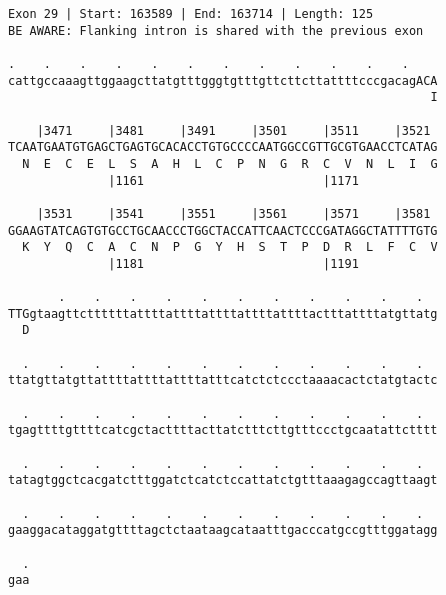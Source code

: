 \documentclass{article}
\begin{document}
\begin{Verbatim}[fontfamily=courier]
Exon 29 | Start: 163589 | End: 163714 | Length: 125
BE AWARE: Flanking intron is shared with the previous exon

.    .    .    .    .    .    .    .    .    .    .    .    
cattgccaaagttggaagcttatgtttgggtgtttgttcttcttattttcccgacagACA
                                                           I

    |3471     |3481     |3491     |3501     |3511     |3521 
TCAATGAATGTGAGCTGAGTGCACACCTGTGCCCCAATGGCCGTTGCGTGAACCTCATAG
  N  E  C  E  L  S  A  H  L  C  P  N  G  R  C  V  N  L  I  G
              |1161                         |1171           

    |3531     |3541     |3551     |3561     |3571     |3581 
GGAAGTATCAGTGTGCCTGCAACCCTGGCTACCATTCAACTCCCGATAGGCTATTTTGTG
  K  Y  Q  C  A  C  N  P  G  Y  H  S  T  P  D  R  L  F  C  V
              |1181                         |1191           

       .    .    .    .    .    .    .    .    .    .    .  
TTGgtaagttcttttttattttattttattttattttattttactttattttatgttatg
  D                                                         

  .    .    .    .    .    .    .    .    .    .    .    .  
ttatgttatgttattttattttattttatttcatctctccctaaaacactctatgtactc

  .    .    .    .    .    .    .    .    .    .    .    .  
tgagttttgttttcatcgctacttttacttatctttcttgtttccctgcaatattctttt

  .    .    .    .    .    .    .    .    .    .    .    .  
tatagtggctcacgatctttggatctcatctccattatctgtttaaagagccagttaagt

  .    .    .    .    .    .    .    .    .    .    .    .  
gaaggacataggatgttttagctctaataagcataatttgacccatgccgtttggatagg

  .
gaa
\end{Verbatim}
\newpage
\end{document}
